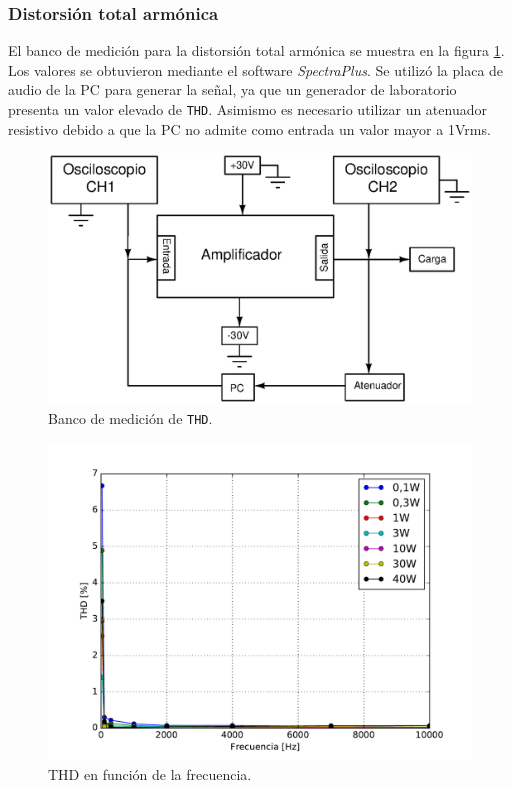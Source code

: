 		\subsubsection{Distorsión total armónica}

		El banco de medición para la distorsión total armónica se muestra en la figura \ref{fig:thd_bco}. Los valores se obtuvieron mediante el software \textit{SpectraPlus}. Se utilizó la placa de audio de la PC para generar la señal, ya que un generador de laboratorio presenta un valor elevado de \texttt{THD}. Asimismo es necesario utilizar un atenuador resistivo debido a que la PC no admite como entrada un valor mayor a 1Vrms. 

		\begin{figure}[h!]
			\centering
			\includegraphics[scale=0.6]{./Figuras/banco_thd.eps}
			\caption{Banco de medición de \texttt{THD}.}
			\label{fig:thd_bco}
		\end{figure}

		\begin{figure}[H]
			\centering
			\includegraphics[scale=0.6]{./Figuras/thd.pdf}
			\caption{THD en función de la frecuencia.}
			\label{fig:thd}
		\end{figure}


